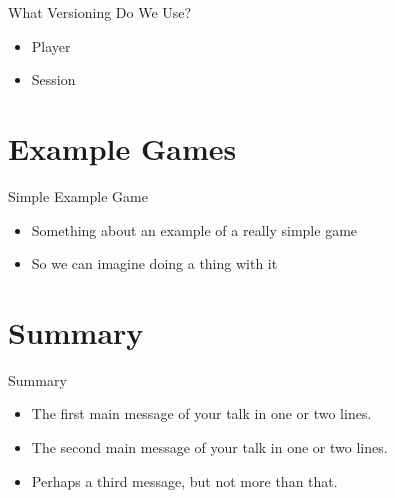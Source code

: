 \documentclass{beamer}
\begin{document}
\begin{frame}{What Versioning Do We Use?}
  \begin{itemize}
  \item Player
  \item Session
  \end{itemize}
\end{frame}

\section[Examples]{Example Games}

\begin{frame}{Simple Example Game}
  \begin{itemize}
  \item Something about an example of a really simple game
  \item So we can imagine doing a thing with it
  \end{itemize}
\end{frame}

\section*{Summary}

\begin{frame}{Summary}
  \begin{itemize}
  \item
    The \alert{first main message} of your talk in one or two lines.
  \item
    The \alert{second main message} of your talk in one or two lines.
  \item
    Perhaps a \alert{third message}, but not more than that.
  \end{itemize}
\end{frame}
\end{document}
